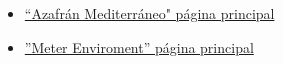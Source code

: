     \begin{itemize} \itemsep0em
        \item \href{http://www.azafranmediterraneo.com.ar/#/inicio}{``Azafrán Mediterráneo" página principal}
        \item \href{https://www.metergroup.com/environment/}{''Meter Enviroment'' página principal}
    \end{itemize}
